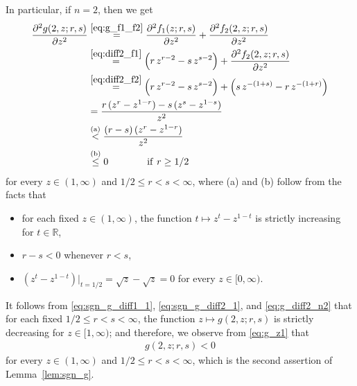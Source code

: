 \documentclass[conference, draftcls, onecolumn]{IEEEtran}
\theoremstyle{plain}
\newcommand{\lemref}[1]{Lemma~\ref{#1}}
\begin{document}
\begin{IEEEproof}[Proof of \lemref{lem:sgn_g}]
In particular, if $n = 2$, then we get
\begin{align}
\frac{ \partial^{2} g(2, z; r, s) }{ \partial z^{2} }
& \overset{\eqref{eq:g_f1_f2}}{=}
\frac{ \partial^{2} f_{1}(z; r, s) }{ \partial z^{2} } + \frac{ \partial^{2} f_{2}(2, z; r, s) }{ \partial z^{2} }
\\
& \overset{\eqref{eq:diff2_f1}}{=}
\Big( r \, z^{r-2} - s \, z^{s-2} \Big) + \frac{ \partial^{2} f_{2}(2, z; r, s) }{ \partial z^{2} }
\\
& \overset{\eqref{eq:diff2_f2}}{=}
\Big( r \, z^{r-2} - s \, z^{s-2} \Big) + \Big( s \, z^{-(1+s)} - r \, z^{-(1+r)} \Big)
\\
& =
\frac{ r \, (z^{r} - z^{1-r}) - s \, (z^{s} - z^{1-s}) }{ z^{2} }
\\
& \overset{\text{(a)}}{<}
\frac{ (r-s) \, (z^{r} - z^{1-r}) }{ z^{2} }
\\
& \overset{\text{(b)}}{\le}
0 \qquad \qquad \mathrm{if} \ r \ge 1/2
\label{eq:g_diff2_n2}
\end{align}
for every $z \in (1, \infty)$ and $1/2 \le r < s < \infty$, where (a) and (b) follow from the facts that
\begin{itemize}
\item
for each fixed $z \in (1, \infty)$, the function $t \mapsto z^{t} - z^{1-t}$ is strictly increasing for $t \in \mathbb{R}$,
\item
$r - s < 0$ whenever $r < s$,
\item
$(z^{t} - z^{1-t})|_{t = 1/2} = \sqrt{z} - \sqrt{z} = 0$ for every $z \in [0, \infty)$.
\end{itemize}
It follows from \eqref{eq:sgn_g_diff1_1}, \eqref{eq:sgn_g_diff2_1}, and \eqref{eq:g_diff2_n2} that for each fixed $1/2 \le r < s < \infty$, the function $z \mapsto g(2, z; r, s)$ is strictly decreasing for $z \in [1, \infty)$;
and therefore, we observe from \eqref{eq:g_z1} that
\begin{align}
g(2, z; r, s)
<
0
\end{align}
for every $z \in (1, \infty)$ and $1/2 \le r < s < \infty$, which is the second assertion of \lemref{lem:sgn_g}.





\end{IEEEproof}
\end{document}
